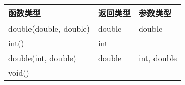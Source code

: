 \begin{longtable}[c]{|l|l|l|}
\hline
函数类型          & 返回类型 & 参数类型 \\ \hline
\endfirsthead
%
\endhead
%
double(double, double) & double      & double                \\ \hline
int()                  & int         &                       \\ \hline
double(int, double)    & double      & int, double           \\ \hline
void()                 &             &                       \\ \hline
\end{longtable}






















